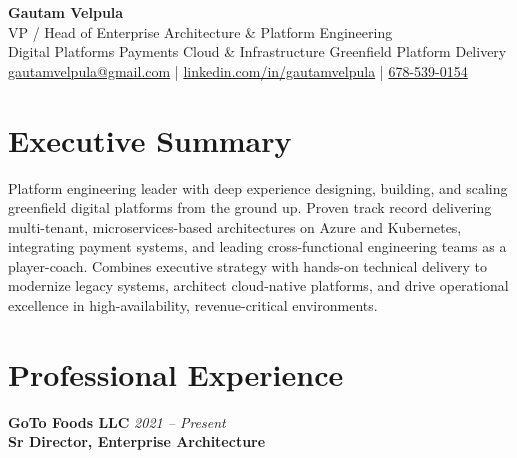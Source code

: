 \documentclass[11pt]{article}
\begin{document}
\begin{center}
    {\LARGE \textbf{Gautam Velpula}} \\[4pt]
    VP / Head of Enterprise Architecture \& Platform Engineering \\[6pt]
    Digital Platforms \textbullet{} Payments \textbullet{} Cloud \& Infrastructure \textbullet{} Greenfield Platform Delivery \\[6pt]
    \href{mailto:gautamvelpula@gmail.com}{gautamvelpula@gmail.com} \;|\;
    \href{https://www.linkedin.com/in/gautamvelpula}{linkedin.com/in/gautamvelpula} \;|\;
    \href{tel:6785390154}{678-539-0154}
  \end{center}

\vspace{8pt}

\section*{Executive Summary}
Platform engineering leader with deep experience designing, building, and scaling greenfield digital platforms from the ground up. Proven track record delivering multi-tenant, microservices-based architectures on Azure and Kubernetes, integrating payment systems, and leading cross-functional engineering teams as a player-coach. Combines executive strategy with hands-on technical delivery to modernize legacy systems, architect cloud-native platforms, and drive operational excellence in high-availability, revenue-critical environments.

\section*{Professional Experience}

\textbf{GoTo Foods LLC} \hfill \textit{2021 -- Present} \\
\textbf{Sr Director, Enterprise Architecture}
\end{document}
